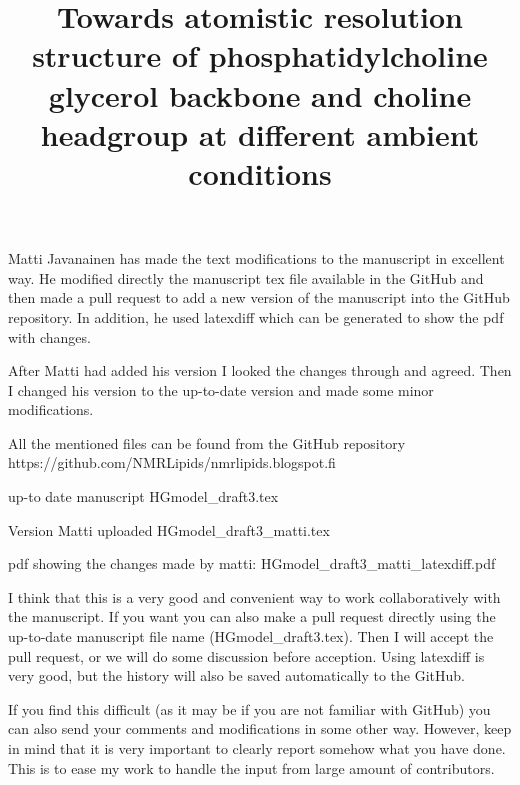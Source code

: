 \documentclass[pre,aps,floatfix,authordate1-4,twocolumn]{revtex4-1}
\begin{document}

\onecolumngrid
{\color{red}
Matti Javanainen has made the text modifications to the manuscript in excellent way. He modified directly the manuscript 
tex file available in the GitHub and then made a pull request to add a new version of the manuscript into the GitHub repository. 
In addition, he used latexdiff which can be generated to show the pdf with changes.

After Matti had added his version I looked the changes through and agreed. Then I changed his version to the up-to-date version 
and made some minor modifications.

All the mentioned files can be found from the GitHub repository
https://github.com/NMRLipids/nmrlipids.blogspot.fi

up-to date manuscript
HGmodel\_draft3.tex

Version Matti uploaded
HGmodel\_draft3\_matti.tex

pdf showing the changes made by matti:
HGmodel\_draft3\_matti\_latexdiff.pdf

I think that this is a very good and convenient way to work collaboratively with the manuscript. If you want you can also make 
a pull request directly using the up-to-date manuscript file name (HGmodel\_draft3.tex). Then I will accept the pull request, 
or we will do some discussion before acception. Using latexdiff is very good, but the history will also be saved automatically 
to the GitHub.

If you find this difficult (as it may be if you are not familiar with GitHub) you can also send your comments and modifications 
in some other way. However, keep in mind that it is very important to clearly report somehow what you have done. 
This is to ease my work to handle the input from large amount of contributors.
}

\title{Towards atomistic resolution structure of phosphatidylcholine glycerol backbone and choline headgroup at different ambient conditions}
\end{document}
